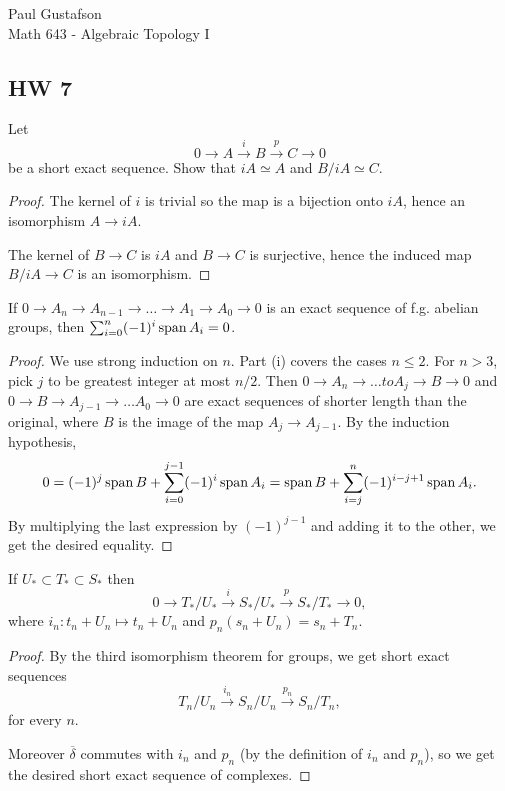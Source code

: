 \documentclass{article}
\begin{document}
\noindent Paul Gustafson\\
\noindent Math 643 - Algebraic Topology I


\subsection*{HW 7}
 Let 
$$0  \to A \overset i \to B \overset p \to C \to 0$$
be a short exact sequence. Show that $iA \simeq A$ and $B/iA \simeq C$.
\begin{proof}
The kernel of $i$ is trivial so the map is a bijection onto $iA$, hence an isomorphism $A \to iA$.

The kernel of $B \to C$ is $iA$ and $B \to C$ is surjective, hence the induced map $B/iA \to C$ is an isomorphism.
\end{proof}

 If $0 \to A_n \to A_{n-1} \to \ldots \to A_1 \to A_0 \to 0$ is an exact sequence of f.g. abelian groups, then
$\sum_{i=0}^n (-1)^i \operatorname{span} A_i = 0$.
\begin{proof}
We use strong induction on $n$. Part (i) covers the cases $n \le 2$. For $n > 3$, pick $j$ to be greatest integer at most $n/2$.
Then $0 \to A_n \to \ldots to A_j \to B \to 0$ and $0 \to B \to A_{j-1} \to \ldots A_0 \to 0$ are exact sequences of shorter length than the original,
where $B$ is the image of the map $A_j \to A_{j-1}$.  By the induction hypothesis, 
$$0 = (-1)^j \operatorname{span} B + \sum_{i=0}^{j-1} (-1)^i \operatorname{span} A_i = \operatorname{span} B + \sum_{i=j}^{n} (-1)^{i-j+1} \operatorname{span} A_i.$$
By multiplying the last expression by $(-1)^{j-1}$ and adding it to the other, we get the desired equality.
\end{proof}

 If $U_* \subset T_* \subset S_*$ then
$$0 \to T_*/U_*  \overset{i}{\to} S_*/U_* \overset{p}{\to} S_*/T_* \to 0,$$
where $i_n: t_n + U_n \mapsto t_n + U_n$ and $p_n(s_n + U_n) = s_n + T_n$.
\begin{proof}
By the third isomorphism theorem for groups, we get short exact sequences
$$T_n/U_n \overset{i_n}{\to} S_n/U_n \overset{p_n}{\to} S_n/T_n,$$
for every $n$.

Moreover $\overline \delta$ commutes with $i_n$ and $p_n$ (by the definition of $i_n$ and $p_n$), so we get the desired short exact sequence of complexes.

\end{proof}
\end{document}
